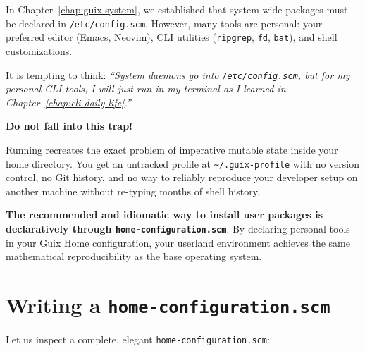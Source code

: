 In Chapter~\ref{chap:guix-system}, we established that system-wide packages must be declared in \texttt{/etc/config.scm}. However, many tools are personal: your preferred editor (Emacs, Neovim), CLI utilities (\texttt{ripgrep}, \texttt{fd}, \texttt{bat}), and shell customizations.

It is tempting to think: \emph{``System daemons go into \texttt{/etc/config.scm}, but for my personal CLI tools, I will just run  in my terminal as I learned in Chapter~\ref{chap:cli-daily-life}.''}

\textbf{Do not fall into this trap!}

Running  recreates the exact problem of imperative mutable state inside your home directory. You get an untracked profile at \texttt{\textasciitilde/.guix-profile} with no version control, no Git history, and no way to reliably reproduce your developer setup on another machine without re-typing months of shell history.

\textbf{The recommended and idiomatic way to install user packages is declaratively through \texttt{home-configuration.scm}}. By declaring personal tools in your Guix Home configuration, your userland environment achieves the same mathematical reproducibility as the base operating system.

\section{Writing a \texttt{home-configuration.scm}}

Let us inspect a complete, elegant \texttt{home-configuration.scm}:

